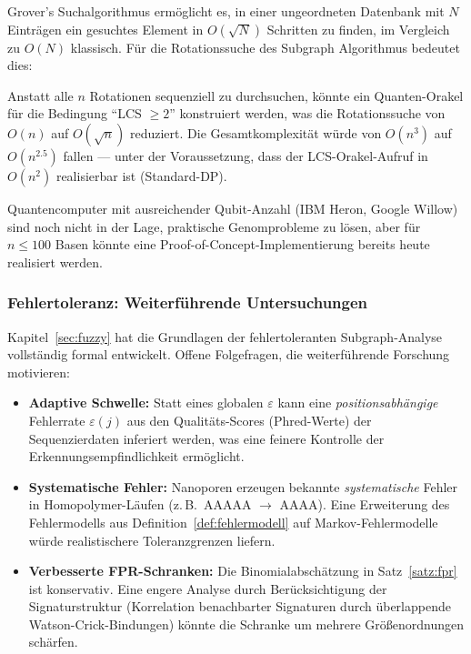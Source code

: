 ﻿\documentclass[a4paper,12pt]{article}
\theoremstyle{definition}
\begin{document}
Grover's Suchalgorithmus ermöglicht es, in einer ungeordneten Datenbank mit
$N$ Einträgen ein gesuchtes Element in $O(\sqrt{N})$ Schritten zu finden,
im Vergleich zu $O(N)$ klassisch. Für die Rotationssuche des Subgraph Algorithmus
bedeutet dies:

Anstatt alle $n$ Rotationen sequenziell zu durchsuchen, könnte ein
Quanten-Orakel für die Bedingung ``LCS $\geq 2$'' konstruiert werden, was die
Rotationssuche von $O(n)$ auf $O(\sqrt{n})$ reduziert. Die Gesamtkomplexität
würde von $O(n^3)$ auf $O(n^{2.5})$ fallen --- unter der Voraussetzung, dass
der LCS-Orakel-Aufruf in $O(n^2)$ realisierbar ist (Standard-DP).

Quantencomputer mit ausreichender Qubit-Anzahl (IBM Heron, Google Willow)
sind noch nicht in der Lage, praktische Genomprobleme zu lösen, aber für
$n \leq 100$ Basen könnte eine Proof-of-Concept-Implementierung bereits heute
realisiert werden.

\subsubsection{Fehlertoleranz: Weiterf\"{u}hrende Untersuchungen}

Kapitel~\ref{sec:fuzzy} hat die Grundlagen der fehlertoleranten Subgraph-Analyse
vollst\"{a}ndig formal entwickelt. Offene Folgefragen, die weiterf\"{u}hrende
Forschung motivieren:

\begin{itemize}
    \item \textbf{Adaptive Schwelle:} Statt eines globalen $\varepsilon$ kann
          eine \textit{positionsabh\"{a}ngige} Fehlerrate $\varepsilon(j)$ aus
          den Qualit\"{a}ts-Scores (Phred-Werte) der Sequenzierdaten inferiert
          werden, was eine feinere Kontrolle der Erkennungsempfindlichkeit
          erm\"{o}glicht.
    \item \textbf{Systematische Fehler:} Nanoporen erzeugen bekannte
          \textit{systematische} Fehler in Homopolymer-L\"{a}ufen
          (z.\,B.\ AAAAA $\to$ AAAA). Eine Erweiterung des Fehlermodells
          aus Definition~\ref{def:fehlermodell} auf Markov-Fehlermodelle
          w\"{u}rde realistischere Toleranzgrenzen liefern.
    \item \textbf{Verbesserte FPR-Schranken:} Die Binomialabsch\"{a}tzung
          in Satz~\ref{satz:fpr} ist konservativ. Eine engere Analyse durch
          Ber\"{u}cksichtigung der Signaturstruktur (Korrelation benachbarter
          Signaturen durch \"{u}berlappende Watson-Crick-Bindungen) k\"{o}nnte
          die Schranke um mehrere Gr\"{o}{\ss}enordnungen sch\"{a}rfen.
\end{itemize}
\end{document}
